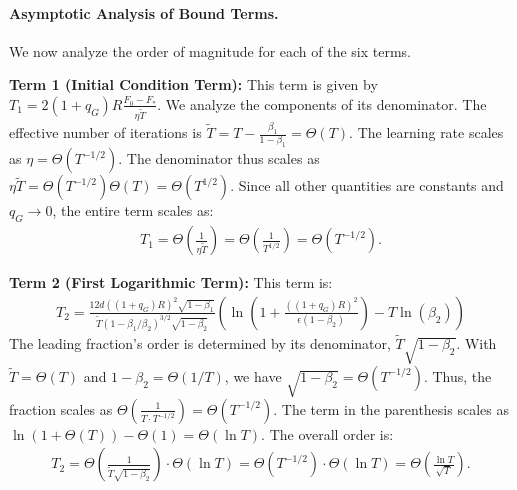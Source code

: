 \documentclass[11pt, letterpaper]{article}
\begin{document}
\paragraph{Asymptotic Analysis of Bound Terms.}
We now analyze the order of magnitude for each of the six terms.

\textbf{Term 1 (Initial Condition Term):} This term is given by $T_1 = 2 (1+q_G)R \frac{F_0 - F_*}{\eta \tilde{T}}$.
We analyze the components of its denominator. The effective number of iterations is $\tilde{T} = T - \frac{\beta_1}{1 - \beta_1} = \Theta(T)$. The learning rate scales as $\eta = \Theta(T^{-1/2})$. The denominator thus scales as $\eta\tilde{T} = \Theta(T^{-1/2})\Theta(T) = \Theta(T^{1/2})$. Since all other quantities are constants and $q_G \to 0$, the entire term scales as:
\begin{align*}
    T_1 = \Theta\left( \frac{1}{\eta \tilde{T}} \right) = \Theta\left(\frac{1}{T^{1/2}}\right) = \Theta(T^{-1/2}).
\end{align*}

\textbf{Term 2 (First Logarithmic Term):} This term is:
\begin{align*}
    T_2 = \frac{12 d ((1+q_G)R)^2 \sqrt{1-\beta_1}}{\tilde{T}(1 - \beta_1 / \beta_2)^{3/2}\sqrt{1 - \beta_2}} \left(\ln\left(1 + \frac{((1+q_G)R)^2}{\epsilon ( 1- \beta_2)}\right) - T \ln(\beta_2)\right)
\end{align*}
The leading fraction's order is determined by its denominator, $\tilde{T}\sqrt{1 - \beta_2}$. With $\tilde{T} = \Theta(T)$ and $1 - \beta_2 = \Theta(1/T)$, we have $\sqrt{1 - \beta_2} = \Theta(T^{-1/2})$. Thus, the fraction scales as $\Theta(\frac{1}{T \cdot T^{-1/2}}) = \Theta(T^{-1/2})$. The term in the parenthesis scales as $\ln(1+\Theta(T)) - \Theta(1) = \Theta(\ln T)$. The overall order is:
\begin{align*}
    T_2 = \Theta\left(\frac{1}{\tilde{T}\sqrt{1 - \beta_2}}\right) \cdot \Theta(\ln T) = \Theta\left(T^{-1/2}\right) \cdot \Theta(\ln T) = \Theta\left(\frac{\ln T}{\sqrt{T}}\right).
\end{align*}
\end{document}
